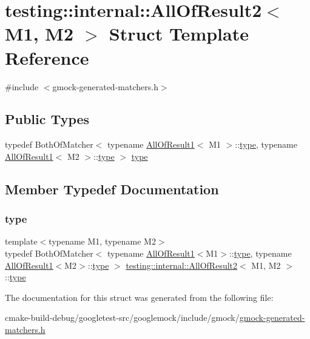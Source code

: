 \hypertarget{structtesting_1_1internal_1_1AllOfResult2}{}\section{testing\+::internal\+::All\+Of\+Result2$<$ M1, M2 $>$ Struct Template Reference}
\label{structtesting_1_1internal_1_1AllOfResult2}


{\ttfamily \#include $<$gmock-\/generated-\/matchers.\+h$>$}

\subsection*{Public Types}
\begin{DoxyCompactItemize}
\item 
typedef Both\+Of\+Matcher$<$ typename \mbox{\hyperlink{structtesting_1_1internal_1_1AllOfResult1}{All\+Of\+Result1}}$<$ M1 $>$\+::\mbox{\hyperlink{structtesting_1_1internal_1_1AllOfResult2_adec0b0ce2fdd07d398e1fdd2cdb88392}{type}}, typename \mbox{\hyperlink{structtesting_1_1internal_1_1AllOfResult1}{All\+Of\+Result1}}$<$ M2 $>$\+::\mbox{\hyperlink{structtesting_1_1internal_1_1AllOfResult2_adec0b0ce2fdd07d398e1fdd2cdb88392}{type}} $>$ \mbox{\hyperlink{structtesting_1_1internal_1_1AllOfResult2_adec0b0ce2fdd07d398e1fdd2cdb88392}{type}}
\end{DoxyCompactItemize}


\subsection{Member Typedef Documentation}
\mbox{\label{structtesting_1_1internal_1_1AllOfResult2_adec0b0ce2fdd07d398e1fdd2cdb88392}} 
\subsubsection{\texorpdfstring{type}{type}}
{\footnotesize\ttfamily template$<$typename M1, typename M2$>$ \\
typedef Both\+Of\+Matcher$<$ typename \mbox{\hyperlink{structtesting_1_1internal_1_1AllOfResult1}{All\+Of\+Result1}}$<$M1$>$\+::\mbox{\hyperlink{structtesting_1_1internal_1_1AllOfResult2_adec0b0ce2fdd07d398e1fdd2cdb88392}{type}}, typename \mbox{\hyperlink{structtesting_1_1internal_1_1AllOfResult1}{All\+Of\+Result1}}$<$M2$>$\+::\mbox{\hyperlink{structtesting_1_1internal_1_1AllOfResult2_adec0b0ce2fdd07d398e1fdd2cdb88392}{type}} $>$ \mbox{\hyperlink{structtesting_1_1internal_1_1AllOfResult2}{testing\+::internal\+::\+All\+Of\+Result2}}$<$ M1, M2 $>$\+::\mbox{\hyperlink{structtesting_1_1internal_1_1AllOfResult2_adec0b0ce2fdd07d398e1fdd2cdb88392}{type}}}



The documentation for this struct was generated from the following file\+:\begin{DoxyCompactItemize}
\item 
cmake-\/build-\/debug/googletest-\/src/googlemock/include/gmock/\mbox{\hyperlink{gmock-generated-matchers_8h}{gmock-\/generated-\/matchers.\+h}}\end{DoxyCompactItemize}
